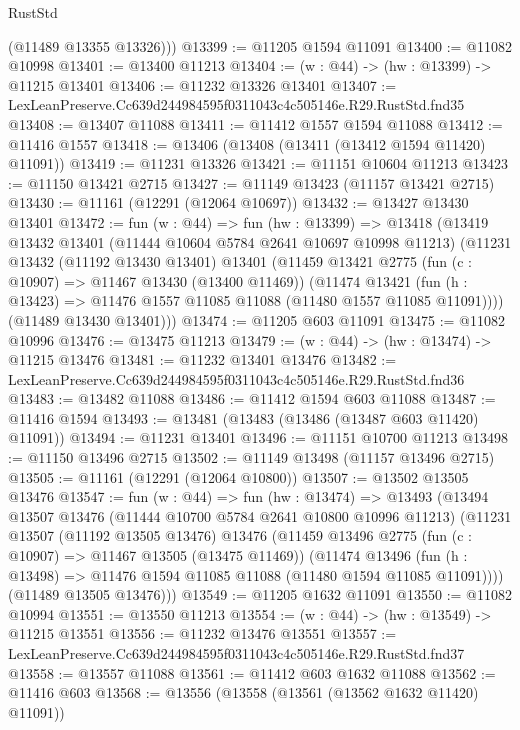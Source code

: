 \begin{lexlean}{RustStd}
\begin{coremodule}
        (@11489 @13355 @13326)))
@13399 := @11205 @1594 @11091
@13400 := @11082 @10998
@13401 := @13400 @11213
@13404 := (w : @44) -> (hw : @13399) -> @11215 @13401
@13406 := @11232 @13326 @13401
@13407 := LexLeanPreserve.Cc639d244984595f0311043c4c505146e.R29.RustStd.fnd35
@13408 := @13407 @11088
@13411 := @11412 @1557 @1594 @11088
@13412 := @11416 @1557
@13418 := @13406 (@13408 (@13411 (@13412 @1594 @11420) @11091))
@13419 := @11231 @13326
@13421 := @11151 @10604 @11213
@13423 := @11150 @13421 @2715
@13427 := @11149 @13423 (@11157 @13421 @2715)
@13430 := @11161 (@12291 (@12064 @10697))
@13432 := @13427 @13430 @13401
@13472 := fun (w : @44) =>
  fun (hw : @13399) =>
  @13418
    (@13419
      @13432
      @13401
      (@11444 @10604 @5784 @2641 @10697 @10998 @11213)
      (@11231
        @13432
        (@11192 @13430 @13401)
        @13401
        (@11459
          @13421
          @2775
          (fun (c : @10907) => @11467 @13430 (@13400 @11469))
          (@11474
            @13421
            (fun (h : @13423) => @11476 @1557 @11085 @11088 (@11480 @1557 @11085 @11091))))
        (@11489 @13430 @13401)))
@13474 := @11205 @603 @11091
@13475 := @11082 @10996
@13476 := @13475 @11213
@13479 := (w : @44) -> (hw : @13474) -> @11215 @13476
@13481 := @11232 @13401 @13476
@13482 := LexLeanPreserve.Cc639d244984595f0311043c4c505146e.R29.RustStd.fnd36
@13483 := @13482 @11088
@13486 := @11412 @1594 @603 @11088
@13487 := @11416 @1594
@13493 := @13481 (@13483 (@13486 (@13487 @603 @11420) @11091))
@13494 := @11231 @13401
@13496 := @11151 @10700 @11213
@13498 := @11150 @13496 @2715
@13502 := @11149 @13498 (@11157 @13496 @2715)
@13505 := @11161 (@12291 (@12064 @10800))
@13507 := @13502 @13505 @13476
@13547 := fun (w : @44) =>
  fun (hw : @13474) =>
  @13493
    (@13494
      @13507
      @13476
      (@11444 @10700 @5784 @2641 @10800 @10996 @11213)
      (@11231
        @13507
        (@11192 @13505 @13476)
        @13476
        (@11459
          @13496
          @2775
          (fun (c : @10907) => @11467 @13505 (@13475 @11469))
          (@11474
            @13496
            (fun (h : @13498) => @11476 @1594 @11085 @11088 (@11480 @1594 @11085 @11091))))
        (@11489 @13505 @13476)))
@13549 := @11205 @1632 @11091
@13550 := @11082 @10994
@13551 := @13550 @11213
@13554 := (w : @44) -> (hw : @13549) -> @11215 @13551
@13556 := @11232 @13476 @13551
@13557 := LexLeanPreserve.Cc639d244984595f0311043c4c505146e.R29.RustStd.fnd37
@13558 := @13557 @11088
@13561 := @11412 @603 @1632 @11088
@13562 := @11416 @603
@13568 := @13556 (@13558 (@13561 (@13562 @1632 @11420) @11091))

\end{coremodule}
\end{lexlean}
